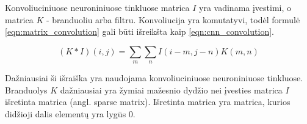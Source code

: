 Konvoliuciniuose neuroniniuose tinkluose matrica $I$ yra vadinama įvestimi, o matrica $K$ - branduoliu arba filtru. Konvoliucija yra komutatyvi, todėl formulė \ref{eqn:matrix_convolution} gali būti išreikšta kaip \ref{eqn:cnn_convolution}.

\begin{equation}
\label{eqn:cnn_convolution}
	(K * I)(i, j) = \sum_{m} \sum_{n} I(i - m, j - n) K(m, n)
\end{equation}

Dažniausiai ši išraiška yra naudojama konvoliuciniuose neuroniniuose tinkluose. Branduolys $K$ dažniausiai yra žymiai mažesnio dydžio nei įvesties matrica $I$ išretinta matrica (angl. sparse matrix). Išretinta matrica yra matrica, kurios didžioji dalis elementų yra lygūs 0.

